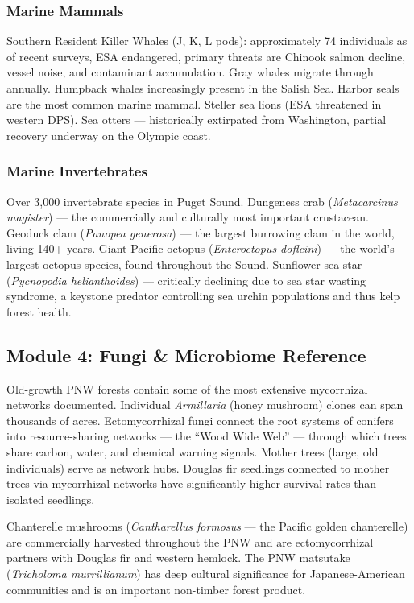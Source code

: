 \documentclass[11pt,letterpaper]{article}
\begin{document}
\subsubsection{Marine Mammals}

Southern Resident Killer Whales (J, K, L pods): approximately 74 individuals as of recent surveys, ESA endangered, primary threats are Chinook salmon decline, vessel noise, and contaminant accumulation. Gray whales migrate through annually. Humpback whales increasingly present in the Salish Sea. Harbor seals are the most common marine mammal. Steller sea lions (ESA threatened in western DPS). Sea otters --- historically extirpated from Washington, partial recovery underway on the Olympic coast.

\subsubsection{Marine Invertebrates}

Over 3,000 invertebrate species in Puget Sound. Dungeness crab (\emph{Metacarcinus magister}) --- the commercially and culturally most important crustacean. Geoduck clam (\emph{Panopea generosa}) --- the largest burrowing clam in the world, living 140+ years. Giant Pacific octopus (\emph{Enteroctopus dofleini}) --- the world's largest octopus species, found throughout the Sound. Sunflower sea star (\emph{Pycnopodia helianthoides}) --- critically declining due to sea star wasting syndrome, a keystone predator controlling sea urchin populations and thus kelp forest health.

\subsection{Module 4: Fungi \& Microbiome Reference}

Old-growth PNW forests contain some of the most extensive mycorrhizal networks documented. Individual \emph{Armillaria} (honey mushroom) clones can span thousands of acres. Ectomycorrhizal fungi connect the root systems of conifers into resource-sharing networks --- the ``Wood Wide Web'' --- through which trees share carbon, water, and chemical warning signals. Mother trees (large, old individuals) serve as network hubs. Douglas fir seedlings connected to mother trees via mycorrhizal networks have significantly higher survival rates than isolated seedlings.

Chanterelle mushrooms (\emph{Cantharellus formosus} --- the Pacific golden chanterelle) are commercially harvested throughout the PNW and are ectomycorrhizal partners with Douglas fir and western hemlock. The PNW matsutake (\emph{Tricholoma murrillianum}) has deep cultural significance for Japanese-American communities and is an important non-timber forest product.
\end{document}
